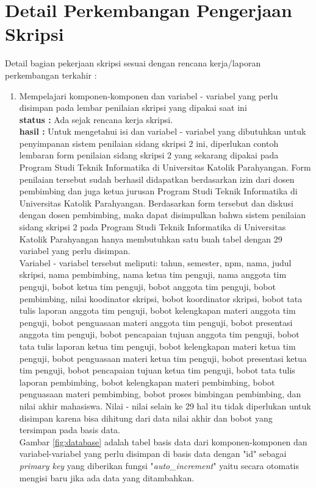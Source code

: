 \documentclass[a4paper,twoside]{article}
\begin{document}
\section{Detail Perkembangan Pengerjaan Skripsi}
Detail bagian pekerjaan skripsi sesuai dengan rencana kerja/laporan perkembangan terkahir :
	\begin{enumerate}
		\item Mempelajari komponen-komponen dan variabel - variabel yang perlu disimpan pada lembar penilaian skripsi yang dipakai saat ini \\
		{\bf status :} Ada sejak rencana kerja skripsi.\\
		{\bf hasil :} Untuk mengetahui isi dan variabel - variabel yang dibutuhkan untuk penyimpanan sistem penilaian sidang skripsi 2 ini, diperlukan contoh lembaran form penilaian sidang skripsi 2 yang sekarang dipakai pada Program Studi Teknik Informatika di Universitas Katolik Parahyangan. Form penilaian tersebut sudah berhasil didapatkan berdasarkan izin dari dosen pembimbing dan juga ketua jurusan Program Studi Teknik Informatika di Universitas Katolik Parahyangan. Berdasarkan form tersebut dan diskusi dengan dosen pembimbing, maka dapat disimpulkan bahwa sistem penilaian sidang skripsi 2 pada Program Studi Teknik Informatika di Universitas Katolik Parahyangan hanya membutuhkan satu buah tabel dengan 29 variabel yang perlu disimpan.\\
		Variabel - variabel tersebut meliputi: tahun, semester, npm, nama, judul skripsi, nama pembimbing, nama ketua tim penguji, nama anggota tim penguji, bobot ketua tim penguji, bobot anggota tim penguji, bobot pembimbing, nilai koodinator skripsi, bobot koordinator skripsi, bobot tata tulis laporan anggota tim penguji, bobot kelengkapan materi anggota tim penguji, bobot penguasaan materi anggota tim penguji, bobot presentasi anggota tim penguji, bobot pencapaian tujuan anggota tim penguji, bobot tata tulis laporan ketua tim penguji, bobot kelengkapan materi ketua tim penguji, bobot penguasaan materi ketua tim penguji, bobot presentasi ketua tim penguji, bobot pencapaian tujuan ketua tim penguji, bobot tata tulis laporan pembimbing, bobot kelengkapan materi pembimbing, bobot penguasaan materi pembimbing, bobot proses bimbingan pembimbing, dan nilai akhir mahasiswa. Nilai - nilai selain ke 29 hal itu tidak diperlukan untuk disimpan karena bisa dihitung dari data nilai akhir dan bobot yang tersimpan pada basis data.\\
		Gambar \ref{fig:database} adalah tabel basis data dari komponen-komponen dan variabel-variabel yang perlu disimpan di basis data dengan "id" sebagai \textit{primary key} yang diberikan fungsi "\textit{auto\_increment}" yaitu secara otomatis mengisi baru jika ada data yang ditambahkan.
		

\end{enumerate}
\end{document}
